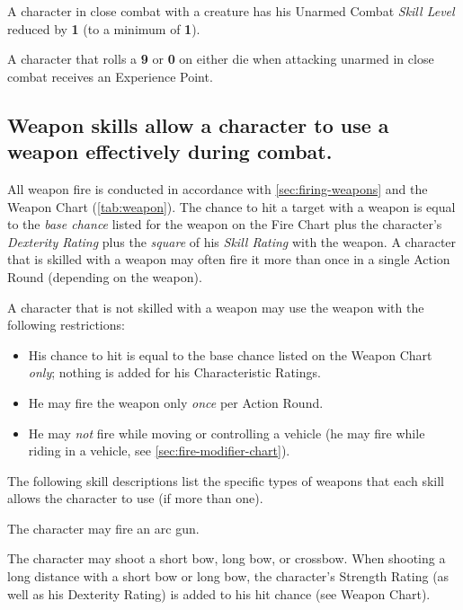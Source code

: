 A character in close combat with a creature has his Unarmed Combat
\emph{Skill Level} reduced by \textbf{1} (to a minimum of \textbf{1}).

A character that rolls a \textbf{9} or \textbf{0} on either die when
attacking unarmed in close combat receives an Experience Point.


\subsection[Weapons Skills]{Weapon skills allow a character to use a
  weapon effectively during combat.}
\label{sec:weapon-skills-allow}

All weapon fire is conducted in accordance with
\ref{sec:firing-weapons} and the Weapon Chart (\ref{tab:weapon}).  The
chance to hit a target with a weapon is equal to the \emph{base
  chance} listed for the weapon on the Fire Chart plus the character's
\emph{Dexterity Rating} plus the \emph{square} of his \emph{Skill
  Rating} with the weapon.  A character that is skilled with a weapon
may often fire it more than once in a single Action Round (depending
on the weapon).

A character that is not skilled with a weapon may use the weapon with
the following restrictions:

\begin{itemize}
\item His chance to hit is equal to the base chance listed on the
  Weapon Chart \emph{only}; nothing is added for his Characteristic
  Ratings.
\item He may fire the weapon only \emph{once} per Action Round.
\item He may \emph{not} fire while moving or controlling a vehicle (he
  may fire while riding in a vehicle, see
  \ref{sec:fire-modifier-chart}).
\end{itemize}

The following skill descriptions list the specific types of weapons
that each skill allows the character to use (if more than one).

\label{sec:skill-arc-gun}

The character may fire an arc gun.  

\label{sec:skill-bows}

The character may shoot a short bow, long bow, or crossbow.  When
shooting a long distance with a short bow or long bow, the character's
Strength Rating (as well as his Dexterity Rating) is added to his hit
chance (see Weapon Chart).

